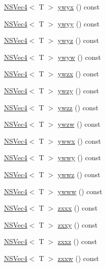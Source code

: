 \begin{DoxyCompactItemize}
\item 
\hyperlink{structNSVec4}{N\-S\-Vec4}$<$ T $>$ \hyperlink{structNSVec4_afbe7ae7e3a804e89eab5f496d08171bb}{ywyx} () const 
\item 
\hyperlink{structNSVec4}{N\-S\-Vec4}$<$ T $>$ \hyperlink{structNSVec4_a4987aa40013c63e1b606b431af4b6c68}{ywyy} () const 
\item 
\hyperlink{structNSVec4}{N\-S\-Vec4}$<$ T $>$ \hyperlink{structNSVec4_a13573e5eacd5169dce1a5cdf95c475cc}{ywyz} () const 
\item 
\hyperlink{structNSVec4}{N\-S\-Vec4}$<$ T $>$ \hyperlink{structNSVec4_aa7c39095ece6f63262c18e2da09724ec}{ywyw} () const 
\item 
\hyperlink{structNSVec4}{N\-S\-Vec4}$<$ T $>$ \hyperlink{structNSVec4_a297982d067f614ce3f423484c69cb335}{ywzx} () const 
\item 
\hyperlink{structNSVec4}{N\-S\-Vec4}$<$ T $>$ \hyperlink{structNSVec4_accfc635b7fc4373d745dd3c7b54b92d0}{ywzy} () const 
\item 
\hyperlink{structNSVec4}{N\-S\-Vec4}$<$ T $>$ \hyperlink{structNSVec4_aec51295ec2f05d761e03cbf793595455}{ywzz} () const 
\item 
\hyperlink{structNSVec4}{N\-S\-Vec4}$<$ T $>$ \hyperlink{structNSVec4_a994776872ecf439aa57b1fb5719c8acc}{ywzw} () const 
\item 
\hyperlink{structNSVec4}{N\-S\-Vec4}$<$ T $>$ \hyperlink{structNSVec4_a71bf14a931b13c29d4ead072f3a45e6a}{ywwx} () const 
\item 
\hyperlink{structNSVec4}{N\-S\-Vec4}$<$ T $>$ \hyperlink{structNSVec4_a5f401436f4c5927eb3a7282146470401}{ywwy} () const 
\item 
\hyperlink{structNSVec4}{N\-S\-Vec4}$<$ T $>$ \hyperlink{structNSVec4_a9c6c484b83de92e51e1d4699e49f51dc}{ywwz} () const 
\item 
\hyperlink{structNSVec4}{N\-S\-Vec4}$<$ T $>$ \hyperlink{structNSVec4_a6e1f677b80763c9091e901498f94f589}{ywww} () const 
\item 
\hyperlink{structNSVec4}{N\-S\-Vec4}$<$ T $>$ \hyperlink{structNSVec4_ad8942d7e226105bd0f56de47e1d37ee5}{zxxx} () const 
\item 
\hyperlink{structNSVec4}{N\-S\-Vec4}$<$ T $>$ \hyperlink{structNSVec4_ac989527a89316ad10b51ba5c8fb0e777}{zxxy} () const 
\item 
\hyperlink{structNSVec4}{N\-S\-Vec4}$<$ T $>$ \hyperlink{structNSVec4_a2bc36a09ef3ea4eddc85318605605e1a}{zxxz} () const 
\item 
\hyperlink{structNSVec4}{N\-S\-Vec4}$<$ T $>$ \hyperlink{structNSVec4_af60036de6a36db721aa1e354a652b6ba}{zxxw} () const 

\end{DoxyCompactItemize}
